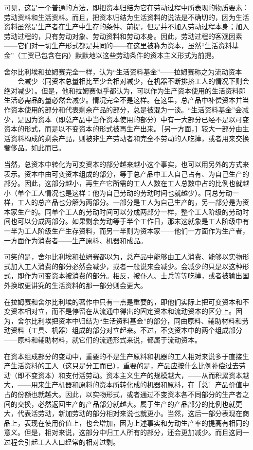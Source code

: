 可见，这是一个普通的方法，即把资本归结为它在劳动过程中所表现的物质要素：劳动资料和生活资料。而且，把资本归结为生活资料的说法是不确切的，因为生活资料虽然是生产者在生产中生存的条件、前提，但是并不加入劳动过程本身；加入劳动过程的，只有劳动对象、劳动资料和劳动本身。因此，劳动过程的客观因素——它们对一切生产形式都是共同的——在这里被称为资本，虽然“生活资料基金”（工资已包含在内）默默地以这些劳动条件的资本主义形式为前提。

舍尔比利埃和拉姆赛完全一样，认为“生活资料基金”——拉姆赛称之为流动资本——会减少（同资本总量相比至少会相对减少，在机器不断排挤工人的情况下则会绝对减少）。但是，他和拉姆赛似乎都认为，可以作为生产资本使用的生活资料即生活必需品的量必然会减少。情况完全不是这样。在这里，总产品中补偿资本并当作资本使用的部分和代表剩余产品的部分，总是被混为一谈。“生活资料基金”会减少，是因为资本（即总产品中当作资本使用的部分）中有一大部分已经不是以可变资本的形式，而是以不变资本的形式被再生产出来。［另一方面，］较大一部分由生活资料构成的剩余产品，则被非生产劳动者和完全不劳动的人吃掉，或者用来交换奢侈品。如此而已。

当然，总资本中转化为可变资本的部分越来越小这个事实，也可以用另外的方式来表示。资本中由可变资本组成的部分，等于总产品中工人自己占有、为自己生产的部分。因此，这部分越小，再生产它所需的工人人数在工人总数中占的比例也就越小（单个工人情况也是这样：他为自己劳动的劳动时间也就越少）。同总劳动一样，工人的总产品也分解为两部分。一部分是工人为自己生产的，另一部分是为资本家生产的。同单个工人的劳动时间可以分成两部分一样，整个工人阶级的劳动时间也可以分成两部分。如果剩余劳动等于半个工作日，那末这就象是工人阶级中有一半为工人阶级生产生存资料，而另一半则为资本家——他们一方面作为生产者，一方面作为消费者——生产原料、机器和成品。

可笑的是，舍尔比利埃和拉姆赛都以为，总产品中能够由工人消费、能够以实物形式加入工人消费的部分必然会减少，或者一般说来会减少。会减少的只是以这种形式，即作为可变资本被消费的部分。相反，被仆人、士兵等等吃掉，或者被输出国外换取更讲究的生活资料的那一部分则会更大。

在拉姆赛和舍尔比利埃的著作中只有一点是重要的，即他们实际上把可变资本和不变资本相对立，而不是停留在从流通中得出的固定资本和流动资本的区分上。因为，舍尔比利埃把资本中归结为“生活资料基金”的部分，同由原料、辅助材料和劳动资料（工具、机器）组成的部分对立起来。不过，不变资本中的两个组成部分——原料和辅助材料，就它们的流通形式来说，都属于流动资本。

在资本组成部分的变动中，重要的不是生产原料和机器的工人相对来说多于直接生产生活资料的工人（这只是分工而已），重要的是，产品应按什么比例补偿过去劳动（即不变资本）和支付活劳动。资本主义生产的规模越大，——从而积累资本越大，——用来生产机器和原料的资本所转化成的机器和原料，在［总］产品价值中占的份额也就越大。因此，以实物形式，或者通过不变资本各不同部分的生产者之间的交换，必然返回生产的产品部分就越大。属于生产的产品部分的比例也就更大，代表活劳动，新加劳动的部分相对来说也就更小。当然，这后一部分表现在商品上，表现在使用价值上，也会增加，因为上述事实和劳动生产率的提高有相同的意义。但是，相对来说，这部分中归工人所有的部分，还会更加减少。而且这同一过程会引起工人人口经常的相对过剩。

